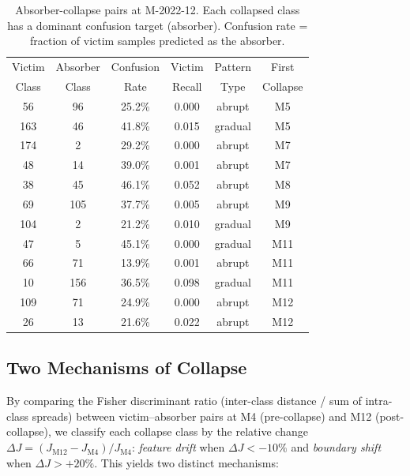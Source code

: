 \documentclass[journal]{IEEEtran}
\begin{document}
\begin{table}[t]
\centering
\caption{Absorber-collapse pairs at M-2022-12. Each collapsed class has a dominant confusion target (absorber). Confusion rate = fraction of victim samples predicted as the absorber.}
\label{tab:absorber_pairs}
\small
\begin{tabular}{@{}cccccc@{}}
\toprule
Victim & Absorber & Confusion & Victim & Pattern & First \\
Class  & Class    & Rate      & Recall & Type    & Collapse \\
\midrule
56  & 96  & 25.2\% & 0.000 & abrupt  & M5 \\
163 & 46  & 41.8\% & 0.015 & gradual & M5 \\
174 & 2   & 29.2\% & 0.000 & abrupt  & M7 \\
48  & 14  & 39.0\% & 0.001 & abrupt  & M7 \\
38  & 45  & 46.1\% & 0.052 & abrupt  & M8 \\
69  & 105 & 37.7\% & 0.005 & abrupt  & M9 \\
104 & 2   & 21.2\% & 0.010 & gradual & M9 \\
47  & 5   & 45.1\% & 0.000 & gradual & M11 \\
66  & 71  & 13.9\% & 0.001 & abrupt  & M11 \\
10  & 156 & 36.5\% & 0.098 & gradual & M11 \\
109 & 71  & 24.9\% & 0.000 & abrupt  & M12 \\
26  & 13  & 21.6\% & 0.022 & abrupt  & M12 \\
\bottomrule
\end{tabular}
\end{table}

\subsection{Two Mechanisms of Collapse}
\label{sec:mechanisms}

By comparing the Fisher discriminant ratio (inter-class distance / sum of intra-class spreads) between victim--absorber pairs at M4 (pre-collapse) and M12 (post-collapse), we classify each collapse class by the relative change $\Delta J = (J_{\text{M12}} - J_{\text{M4}}) / J_{\text{M4}}$: \textit{feature drift} when $\Delta J < -10\%$ and \textit{boundary shift} when $\Delta J > +20\%$. This yields two distinct mechanisms:
\end{document}
